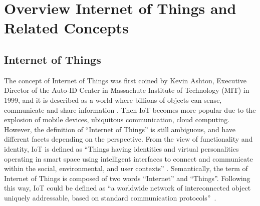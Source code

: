 \section{Overview Internet of Things and Related Concepts }
\subsection{Internet of Things}
The concept of Internet of Things was first coined by Kevin Ashton, Executive Director of the Auto-ID Center in Massachute Institute of Technology (MIT) in 1999, and it is described as a world where billions of objects can sense, communicate and share information \cite{madakam2015internet}. Then IoT becomes more popular due to the explosion of mobile devices, ubiquitous communication, cloud computing. However, the definition of ``Internet of Things'' is still ambiguous, and have different facets depending on the perspective. From the view of functionality and identity, IoT is defined as ``Things having identities and virtual personalities operating in smart space using intelligent interfaces to connect and communicate within the social, environmental, and user contexts'' \cite{ray2018survey}. Semantically, the term of Internet of Things is composed of two words ``Internet'' and ``Things''. Following this way, IoT could be defined as ``a worldwide network of interconnected object uniquely addressable, based on standard communication protocols''~\cite{minerva2015towards}.\\

